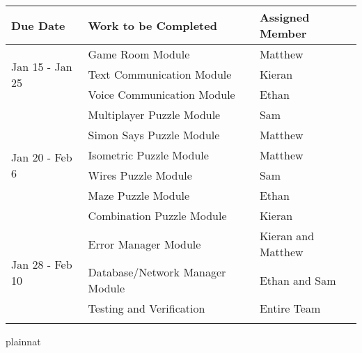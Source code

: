 \documentclass[12pt, titlepage]{article}
\begin{document}
\begin{table}[H]
\begin{tabular}{lll}
\hline
\multicolumn{1}{|l|}{\textbf{Due Date}}                & \multicolumn{1}{l|}{\textbf{Work to be Completed}}   & \multicolumn{1}{l|}{\textbf{Assigned Member}} \\ \hline
\multicolumn{1}{|l|}{\multirow{3}{*}{Jan 15 - Jan 25}} & \multicolumn{1}{l|}{Game Room Module}                & \multicolumn{1}{l|}{Matthew}                  \\ \cline{2-3} 
\multicolumn{1}{|l|}{}                                 & \multicolumn{1}{l|}{Text Communication Module}       & \multicolumn{1}{l|}{Kieran}                   \\ \cline{2-3} 
\multicolumn{1}{|l|}{}                                 & \multicolumn{1}{l|}{Voice Communication Module}      & \multicolumn{1}{l|}{Ethan}                    \\ \hline
\multicolumn{1}{|l|}{\multirow{6}{*}{Jan 20 - Feb 6}}  & \multicolumn{1}{l|}{Multiplayer Puzzle Module}       & \multicolumn{1}{l|}{Sam}                      \\ \cline{2-3} 
\multicolumn{1}{|l|}{}                                 & \multicolumn{1}{l|}{Simon Says Puzzle Module}        & \multicolumn{1}{l|}{Matthew}                  \\ \cline{2-3} 
\multicolumn{1}{|l|}{}                                 & \multicolumn{1}{l|}{Isometric Puzzle Module}         & \multicolumn{1}{l|}{Matthew}                  \\ \cline{2-3} 
\multicolumn{1}{|l|}{}                                 & \multicolumn{1}{l|}{Wires Puzzle Module}             & \multicolumn{1}{l|}{Sam}                      \\ \cline{2-3} 
\multicolumn{1}{|l|}{}                                 & \multicolumn{1}{l|}{Maze Puzzle Module}              & \multicolumn{1}{l|}{Ethan}                    \\ \cline{2-3} 
\multicolumn{1}{|l|}{}                                 & \multicolumn{1}{l|}{Combination Puzzle Module}       & \multicolumn{1}{l|}{Kieran}                   \\ \hline
\multicolumn{1}{|l|}{\multirow{3}{*}{Jan 28 - Feb 10}} & \multicolumn{1}{l|}{Error Manager Module}            & \multicolumn{1}{l|}{Kieran and Matthew}       \\ \cline{2-3} 
\multicolumn{1}{|l|}{}                                 & \multicolumn{1}{l|}{Database/Network Manager Module} & \multicolumn{1}{l|}{Ethan and Sam}            \\ \cline{2-3} 
\multicolumn{1}{|l|}{}                                 & \multicolumn{1}{l|}{Testing and Verification}        & \multicolumn{1}{l|}{Entire Team}              \\ \hline
                                                       &                                                      &                                              
\end{tabular}
\end{table}
 {plainnat}


\newpage{}
\end{document}
